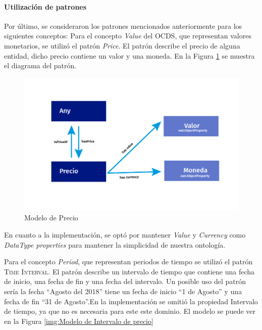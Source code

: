 \paragraph{Utilización de patrones}\hfill \break
Por último, se consideraron los patrones mencionados anteriormente para los siguientes conceptos:
Para el concepto \textit{Value} del OCDS, que representan valores monetarios, se utilizó el patrón \textit{Price}. El patrón describe el precio de alguna entidad, dicho precio contiene un valor y una moneda. En la Figura \ref{img:Modelo de Precio} se muestra el diagrama del patrón.

\begin{figure}[ht!]
    \centering
    \includegraphics[width=150mm]{figuras/Diagramas_Precio.png}
    \caption{Modelo de Precio}
    \label{img:Modelo de Precio}
    
\end{figure}

En cuanto a la implementación, se optó por mantener \textit{Value} y \textit{Currency} como \textit{DataType properties} para mantener la simplicidad de nuestra ontología.

Para el concepto \textit{Period}, que representan periodos de tiempo se utilizó el patrón \textsc{Time Interval}. El patrón describe un intervalo de tiempo que contiene una fecha de inicio, una fecha de fin y una fecha del intervalo. Un posible uso del patrón sería la fecha “Agosto del 2018” tiene un fecha de inicio “1 de Agosto” y una fecha de fin “31 de Agosto”.En la implementación se omitió la propiedad Intervalo de tiempo, ya que no es necesaria para este este dominio. El modelo se puede ver en la Figura \ref{img:Modelo de Intervalo de precio}

